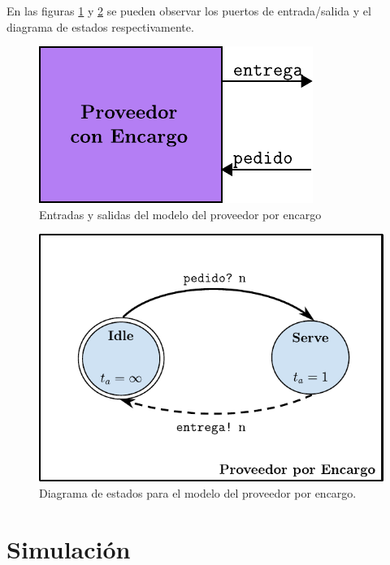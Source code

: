 \documentclass[10pt]{article}
\begin{document}
En las figuras \ref{fig:PE-esquematico} y \ref{fig:PE-estados} se pueden observar los puertos de entrada/salida y el diagrama de estados respectivamente.

\begin{figure}[htbp]
	\centering
	\includegraphics{img/PE-esquematico}
	\caption{Entradas y salidas del modelo del proveedor por encargo}
	\label{fig:PE-esquematico}
\end{figure}

\begin{figure}[htbp]
	\centering
	\includegraphics{img/proveedorEncargodevsgraph}
	\caption{Diagrama de estados para el modelo del proveedor por encargo.}
	\label{fig:PE-estados}
\end{figure}
\FloatBarrier

\section{Simulación}
\end{document}
